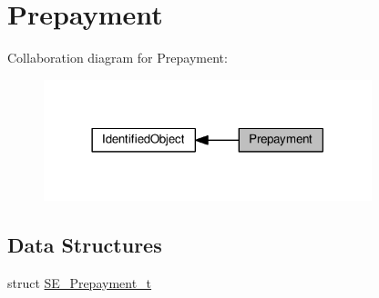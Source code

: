 \hypertarget{group__Prepayment}{}\section{Prepayment}
\label{group__Prepayment}
Collaboration diagram for Prepayment\+:\nopagebreak
\begin{figure}[H]
\begin{center}
\leavevmode
\includegraphics[width=270pt]{group__Prepayment}
\end{center}
\end{figure}
\subsection*{Data Structures}
\begin{DoxyCompactItemize}
\item 
struct \hyperlink{structSE__Prepayment__t}{S\+E\+\_\+\+Prepayment\+\_\+t}
\end{DoxyCompactItemize}
